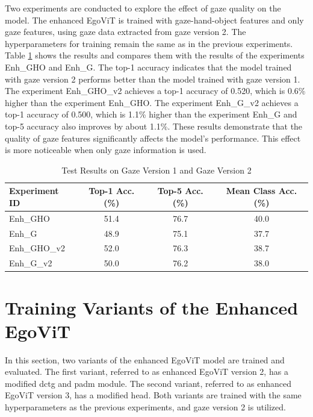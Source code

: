 Two experiments are conducted to explore the effect of gaze quality on the model. The enhanced EgoViT is trained with gaze-hand-object features and only gaze features, using gaze data extracted from gaze version 2. The hyperparameters for training remain the same as in the previous experiments. Table \ref{tab:Results_table3} shows the results and compares them with the results of the experiments Enh\_GHO and Enh\_G. The top-1 accuracy indicates that the model trained with gaze version 2 performs better than the model trained with gaze version 1.
The experiment Enh\_GHO\_v2 achieves a top-1 accuracy of 0.520, which is 0.6\% higher than the experiment Enh\_GHO. The experiment Enh\_G\_v2 achieves a top-1 accuracy of 0.500, which is 1.1\% higher than the experiment Enh\_G and top-5 accuracy also improves by about 1.1\%. These results demonstrate that the quality of gaze features significantly affects the model's performance. This effect is more noticeable when only gaze information is used.
\vspace{5mm}
\begin{table}[htbp]
    \centering
    \caption{Test Results on Gaze Version 1 and Gaze Version 2}
    \begin{tabular}{lccc}
    \hline\hline
    Experiment ID & Top-1 Acc.(\%)& Top-5 Acc.(\%)& Mean Class Acc.(\%) \\
    \hline
    Enh\_GHO     & 51.4 & 76.7 & 40.0 \\
    Enh\_G       & 48.9 & 75.1 & 37.7 \\
    Enh\_GHO\_v2 & 52.0 & 76.3 & 38.7 \\
    Enh\_G\_v2   & 50.0 & 76.2 & 38.0 \\
    \hline\hline
    \end{tabular}
    \label{tab:Results_table3}
\end{table}


\section{Training Variants of the Enhanced EgoViT}
\label{sec:Training Variants of the Extended EgoViT}
In this section, two variants of the enhanced EgoViT model are trained and evaluated. The first variant, referred to as enhanced EgoViT version 2, has a modified \gls{dctg} and \gls{padm} module. The second variant, referred to as enhanced EgoViT version 3, has a modified head. Both variants are trained with the same hyperparameters as the previous experiments, and gaze version 2 is utilized.

